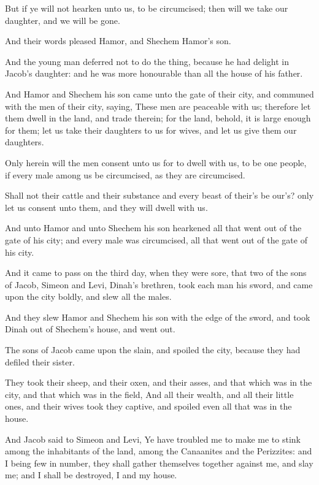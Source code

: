 \verse But if ye will not hearken unto us, to be circumcised; then will we take our daughter, and we will be gone.

\verse And their words pleased Hamor, and Shechem Hamor's son.

\verse And the young man deferred not to do the thing, because he had delight in Jacob's daughter: and he was more honourable than all the house of his father.

\verse And Hamor and Shechem his son came unto the gate of their city, and communed with the men of their city, saying, \verse These men are peaceable with us; therefore let them dwell in the land, and trade therein; for the land, behold, it is large enough for them; let us take their daughters to us for wives, and let us give them our daughters.

\verse Only herein will the men consent unto us for to dwell with us, to be one people, if every male among us be circumcised, as they are circumcised.

\verse Shall not their cattle and their substance and every beast of their's be our's? only let us consent unto them, and they will dwell with us.

\verse And unto Hamor and unto Shechem his son hearkened all that went out of the gate of his city; and every male was circumcised, all that went out of the gate of his city.

\verse And it came to pass on the third day, when they were sore, that two of the sons of Jacob, Simeon and Levi, Dinah's brethren, took each man his sword, and came upon the city boldly, and slew all the males.

\verse And they slew Hamor and Shechem his son with the edge of the sword, and took Dinah out of Shechem's house, and went out.

\verse The sons of Jacob came upon the slain, and spoiled the city, because they had defiled their sister.

\verse They took their sheep, and their oxen, and their asses, and that which was in the city, and that which was in the field, \verse And all their wealth, and all their little ones, and their wives took they captive, and spoiled even all that was in the house.

\verse And Jacob said to Simeon and Levi, Ye have troubled me to make me to stink among the inhabitants of the land, among the Canaanites and the Perizzites: and I being few in number, they shall gather themselves together against me, and slay me; and I shall be destroyed, I and my house.

